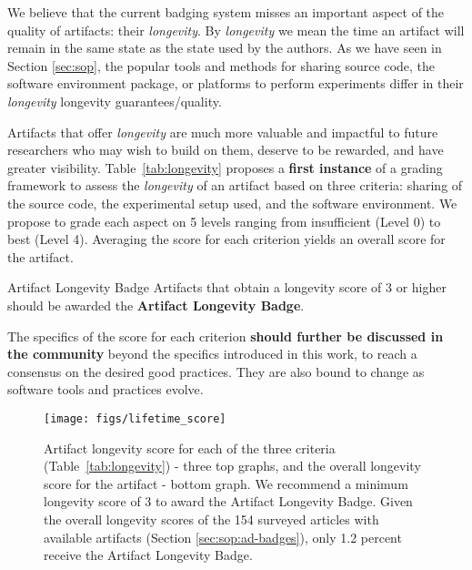 \documentclass[sigconf,natbib=false]{acmart}
\begin{document}
We believe that the current badging system misses an important aspect of the quality of artifacts: their \emph{longevity}.
By \emph{longevity} we mean the time an artifact will remain in the same state as the state used by the authors.
As we have seen in Section \ref{sec:sop}, the popular tools and methods for sharing source code, the software environment package, or platforms to perform experiments differ in their \emph{longevity} longevity guarantees/quality.

Artifacts that offer \emph{longevity} are much more valuable and impactful to future researchers who may wish to build on them, deserve to be rewarded, and have greater visibility.
Table\ \ref{tab:longevity} proposes a \textbf{first instance} of a grading framework to assess the \emph{longevity} of an artifact based on three criteria: sharing of the source code, the experimental setup used, and the software environment.
We propose to grade each aspect on 5 levels ranging from insufficient (Level 0) to best (Level 4).
Averaging the score for each criterion yields an overall score for the artifact.
\begin{recommendation*}{Artifact Longevity Badge}{}
  Artifacts that obtain a longevity score of 3 or higher should be awarded the \textbf{Artifact Longevity Badge}. 
\end{recommendation*}
The specifics of the score for each criterion \textbf{should further be discussed in the community} beyond the specifics introduced in this work, to reach a consensus on the desired good practices.
They are also bound to change as software tools and practices evolve.


\begin{figure}
  \centering
    \texttt{[image: figs/lifetime\_score]}
  \caption{Artifact longevity score for each of the three criteria (Table~\ref{tab:longevity}) - three top graphs, and the overall longevity score for the artifact - bottom graph.
  We recommend a minimum longevity score of 3 to award the Artifact Longevity Badge.
  Given the overall longevity scores of the 154 surveyed articles with available artifacts (Section \ref{sec:sop:ad-badges}), only 1.2 percent receive the Artifact Longevity Badge.}\label{fig:longevity_score}
\end{figure}
\end{document}
